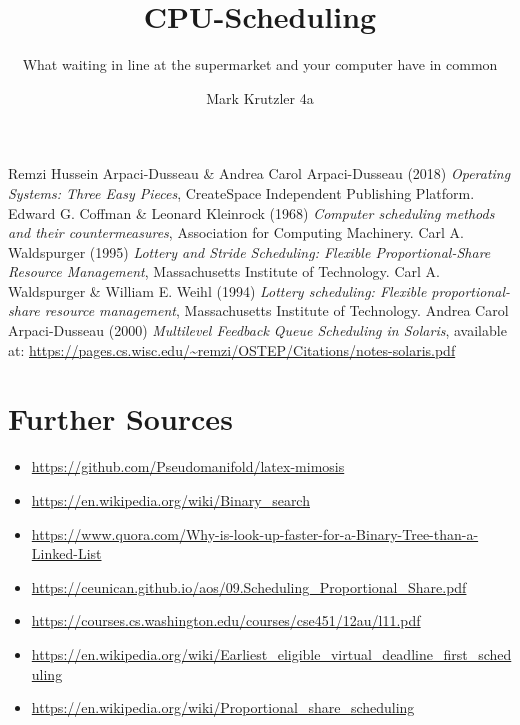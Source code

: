 \documentclass{mimosis}
\title{{CPU-Scheduling}}
\subtitle{What waiting in line at the supermarket and your computer have in common}
\author{Mark Krutzler 4a}
\begin{document}
          \frontmatter
          

          \tableofcontents

          \mainmatter


          

          

          \backmatter

          \begin{thebibliography}{99}
              Remzi Hussein Arpaci-Dusseau \& Andrea Carol Arpaci-Dusseau (2018) \emph{Operating Systems: Three Easy Pieces}, CreateSpace Independent Publishing Platform.
              Edward G. Coffman \& Leonard Kleinrock (1968) \emph{Computer scheduling methods and their countermeasures}, Association for Computing Machinery.
              Carl A. Waldspurger (1995) \emph{Lottery and Stride Scheduling: Flexible Proportional-Share Resource Management}, Massachusetts Institute of Technology.
              Carl A. Waldspurger \& William E. Weihl (1994) \emph{Lottery scheduling: Flexible proportional-share resource management}, Massachusetts Institute of Technology.
              Andrea Carol Arpaci-Dusseau (2000) \emph{Multilevel Feedback Queue Scheduling in Solaris}, available at: \url{https://pages.cs.wisc.edu/~remzi/OSTEP/Citations/notes-solaris.pdf}
          \end{thebibliography}

          \section*{Further Sources}
          \begin{itemize}
            \item \url{https://github.com/Pseudomanifold/latex-mimosis}
            \item \url{https://en.wikipedia.org/wiki/Binary_search}
            \item \url{https://www.quora.com/Why-is-look-up-faster-for-a-Binary-Tree-than-a-Linked-List}
            \item \url{https://ceunican.github.io/aos/09.Scheduling_Proportional_Share.pdf}
            \item \url{https://courses.cs.washington.edu/courses/cse451/12au/l11.pdf}
            \item \url{https://en.wikipedia.org/wiki/Earliest_eligible_virtual_deadline_first_scheduling}
            \item \url{https://en.wikipedia.org/wiki/Proportional_share_scheduling}
          \end{itemize}

          
\end{document}
